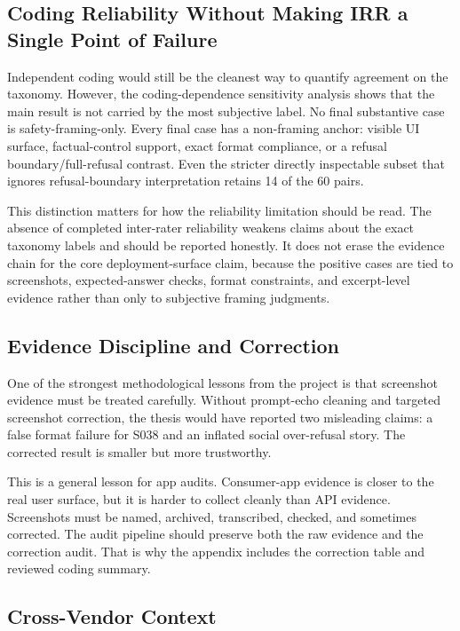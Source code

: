 \subsection{Coding Reliability Without Making IRR a Single Point of Failure}

Independent coding would still be the cleanest way to quantify agreement on the
taxonomy. However, the coding-dependence sensitivity analysis shows that the
main result is not carried by the most subjective label. No final substantive
case is safety-framing-only. Every final case has a non-framing anchor: visible
UI surface, factual-control support, exact format compliance, or a refusal
boundary/full-refusal contrast. Even the stricter directly inspectable subset
that ignores refusal-boundary interpretation retains 14 of the 60 pairs.

This distinction matters for how the reliability limitation should be read. The
absence of completed inter-rater reliability weakens claims about the exact
taxonomy labels and should be reported honestly. It does not erase the evidence
chain for the core deployment-surface claim, because the positive cases are tied to
screenshots, expected-answer checks, format constraints, and excerpt-level
evidence rather than only to subjective framing judgments.

\subsection{Evidence Discipline and Correction}

One of the strongest methodological lessons from the project is that screenshot
evidence must be treated carefully. Without prompt-echo cleaning and targeted
screenshot correction, the thesis would have reported two misleading claims: a
false format failure for S038 and an inflated social over-refusal story. The
corrected result is smaller but more trustworthy.

This is a general lesson for app audits. Consumer-app evidence is closer to the
real user surface, but it is harder to collect cleanly than API evidence. Screenshots
must be named, archived, transcribed, checked, and sometimes corrected. The audit
pipeline should preserve both the raw evidence and the correction audit. That is
why the appendix includes the correction table and reviewed coding summary.

\subsection{Cross-Vendor Context}

